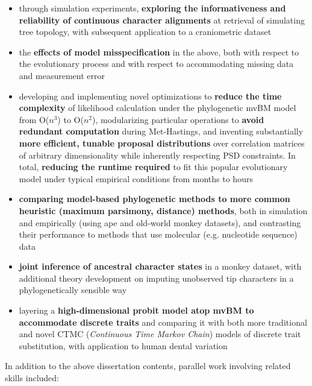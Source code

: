 \documentclass[12pt]{article}
\begin{document}
\begin{itemize}[noitemsep]

\item through simulation experiments, \textbf{exploring the informativeness and reliability of continuous character alignments} at retrieval of simulating tree topology, with subsequent application to a craniometric dataset 
\item the \textbf{effects of model misspecification} in the above, both with respect to the evolutionary process and with respect to accommodating missing data and measurement error
\item developing and implementing novel optimizations to \textbf{reduce the time complexity} of likelihood calculation under the phylogenetic mvBM model from O($n^3$) to O($n^2$), modularizing particular operations to \textbf{avoid redundant computation} during Met-Hastings, and inventing substantially \textbf{more efficient, tunable proposal distributions} over correlation matrices of arbitrary dimensionality while inherently respecting PSD constraints. In total, \textbf{reducing the runtime required} to fit this popular evolutionary model under typical empirical conditions from months to hours
\item \textbf{comparing model-based phylogenetic methods to more common heuristic (maximum parsimony, distance) methods}, both in simulation and empirically (using ape and old-world monkey datasets), and contrasting their performance to methods that use molecular (e.g. nucleotide sequence) data
\item \textbf{joint inference of ancestral character states} in a monkey dataset, with additional theory development on imputing unobserved tip characters in a phylogenetically sensible way 
\item layering a \textbf{high-dimensional probit model atop mvBM to accommodate discrete traits} and comparing it with both more traditional and novel CTMC (\emph{Continuous Time Markov Chain}) models of discrete trait substitution, with application to human dental variation

\end{itemize}

In addition to the above dissertation contents, parallel work involving related skills included:
\end{document}
